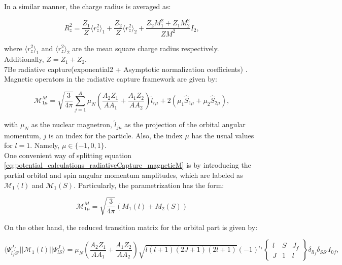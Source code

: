 \documentclass[openany]{book}
\begin{document}
In a similar manner, the charge radius is averaged as: 


\begin{equation}\label{eq:potential_meanRadius_charge}
	R^2_z = \frac{Z_1}{Z} \langle r^{2}_{z} \rangle_1 +   \frac{Z_2}{Z} \langle r^{2}_{z} \rangle_2 + \frac{Z_2M^2_1 + Z_1M^2_2 }{ZM^2}I_2,
\end{equation}

where $\langle r^{2}_{z} \rangle_1$ and $\langle r^{2}_{z} \rangle_2$ are the mean square charge radius respectively. Additionally, $Z = Z_1 + Z_2$. \\

7Be radiative capture(exponential2 + Asymptotic normalization coefficients) \cite{tursunov_turakulov_kadyrov_blokhintsev_2021}. \\

Magnetic operators in the radiative capture framework are given by:

\begin{equation}\label{eq:potential_calculations_radiativeCapture_magneticM}
		\mathcal{M}^{M}_{1\mu} = \sqrt{\frac{3}{4\pi}} \sum_{j=1}^{A}{\mu_N \left(\frac{A_2Z_1}{AA_1} + \frac{A_1Z_2}{AA_2}\right) \hat l _{r \mu} + 2(\mu_1\hat S_{1\mu} + \mu_2\hat S_{2\mu})},
\end{equation}

with $\mu_N$ as the nuclear magnetron, $\hat l_{j\mu}$ as the projection of the orbital angular momentum, $j$ is an index for the particle. Also, the index $\mu$ has the usual values for $l=1$. Namely, $\mu \in \{-1, 0, 1\}$. \\

One convenient way of splitting equation \ref{eq:potential_calculations_radiativeCapture_magneticM} is by introducing the partial orbital and spin angular momentum amplitudes, which are labeled as $\mathcal{M}_1(l)$ and $\mathcal{M}_1(S)$. Particularly, the parametrization has the form: 

\begin{equation}\label{eq:potential_calculations_radiativeCapture_magneticM_simplified}
	\mathcal{M}^{M}_{1\mu} = \sqrt{\frac{3}{4\pi}}(M_1(l) + M_2(S))
\end{equation}

On the other hand, the reduced transition matrix for the orbital part is given by: 

\begin{equation}\label{eq:potential_calculations_radiativeCapture_magneticM_reduced}
	\langle \Psi^{J_f}_{l_fS'}  ||  \mathcal{M}_1(l) ||  \Psi^{J}_{lS} \rangle = \mu_N \left( \frac{A_2Z_1}{AA_1} + \frac{A_1Z_2}{AA_2} \right) \sqrt{l(l+1)(2J + 1)(2l + 1)} (-1)^{\epsilon_1} \left \{ \begin{matrix}
		l & S & J_f \\
		J & 1 & l
	\end{matrix} \right \} \delta_{ll_f} \delta_{SS'} I_{0f},
\end{equation}
\end{document}
